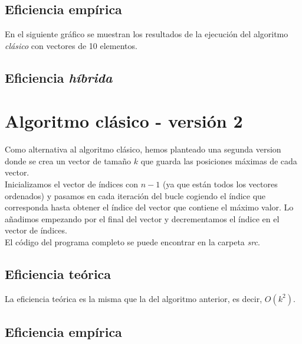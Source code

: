 \documentclass[11pt]{article}
\begin{document}
\subsection*{Eficiencia empírica}

En el siguiente gráfico se muestran los resultados de la
ejecución del algoritmo \textit{clásico} con vectores de 10 elementos.

\begin{center}
	
\end{center}

\subsection*{Eficiencia \textit{híbrida}}

\section*{Algoritmo clásico - versión 2}
 
 Como alternativa al algoritmo clásico, hemos planteado una segunda version donde se crea un vector de tamaño $k$ que guarda las posiciones máximas de cada vector.\\
 
Inicializamos el vector de índices con $n - 1$ (ya que están todos los vectores ordenados) y pasamos en cada iteración del bucle cogiendo el índice que corresponda hasta obtener el índice del vector que contiene el máximo valor. Lo añadimos empezando por el final del vector y decrementamos el índice en el vector de índices. \\
 
 El código del programa completo se puede encontrar en la carpeta \textit{src}.\\
 
 
 
 \subsection*{Eficiencia teórica}
 
 La eficiencia teórica es la misma que la del algoritmo anterior, es decir, $O(k^2)$.
 
 \subsection*{Eficiencia empírica}
 
\end{document}
